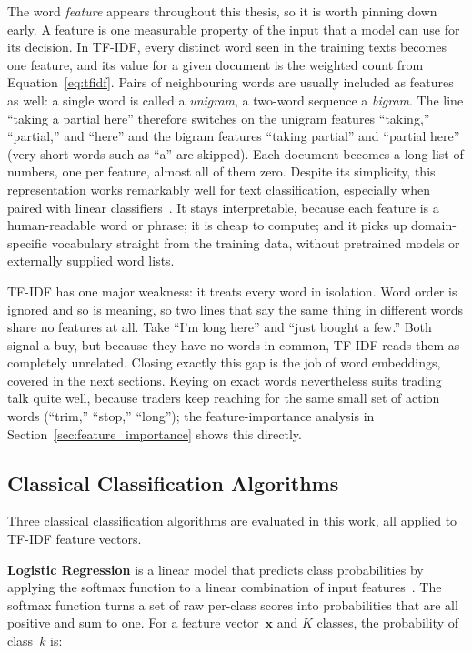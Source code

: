 The word \emph{feature} appears throughout this thesis, so it is worth pinning down early. A feature is one measurable property of the input that a model can use for its decision. In TF-IDF, every distinct word seen in the training texts becomes one feature, and its value for a given document is the weighted count from Equation~\ref{eq:tfidf}. Pairs of neighbouring words are usually included as features as well: a single word is called a \emph{unigram}, a two-word sequence a \emph{bigram}. The line ``taking a partial here'' therefore switches on the unigram features ``taking,'' ``partial,'' and ``here'' and the bigram features ``taking partial'' and ``partial here'' (very short words such as ``a'' are skipped). Each document becomes a long list of numbers, one per feature, almost all of them zero. Despite its simplicity, this representation works remarkably well for text classification, especially when paired with linear classifiers~\cite{joachims1998text}. It stays interpretable, because each feature is a human-readable word or phrase; it is cheap to compute; and it picks up domain-specific vocabulary straight from the training data, without pretrained models or externally supplied word lists.

TF-IDF has one major weakness: it treats every word in isolation. Word order is ignored and so is meaning, so two lines that say the same thing in different words share no features at all. Take ``I'm long here'' and ``just bought a few.'' Both signal a buy, but because they have no words in common, TF-IDF reads them as completely unrelated. Closing exactly this gap is the job of word embeddings, covered in the next sections. Keying on exact words nevertheless suits trading talk quite well, because traders keep reaching for the same small set of action words (``trim,'' ``stop,'' ``long''); the feature-importance analysis in Section~\ref{sec:feature_importance} shows this directly.

\subsection{Classical Classification Algorithms}
\label{sec:classical_classifiers}

Three classical classification algorithms are evaluated in this work, all applied to TF-IDF feature vectors.

\textbf{Logistic Regression} is a linear model that predicts class probabilities by applying the softmax function to a linear combination of input features~\cite{hosmer2013applied}. The softmax function turns a set of raw per-class scores into probabilities that are all positive and sum to one. For a feature vector~$\mathbf{x}$ and $K$ classes, the probability of class~$k$ is:

